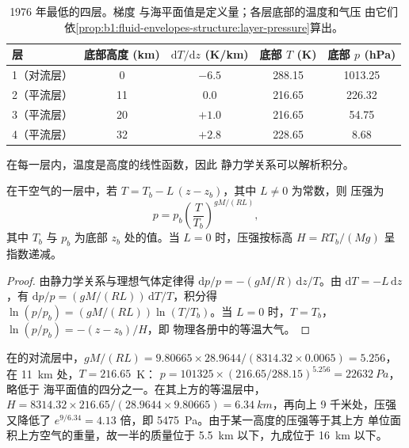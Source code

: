 \begin{table}[ht]
\centering
\small
\renewcommand{\arraystretch}{1.2}
\begin{tabular}{|l|c|c|c|c|}
\hline
层 & 底部高度 (km) & $\mathrm dT/\mathrm dz$ (K/km) & 底部 $T$ (K) & 底部 $p$ (hPa) \\
\hline
1（对流层） & 0 & $-6.5$ & 288.15 & 1013.25 \\
2（平流层） & 11 & 0.0 & 216.65 & 226.32 \\
3（平流层） & 20 & $+1.0$ & 216.65 & 54.75 \\
4（平流层） & 32 & $+2.8$ & 228.65 & 8.68 \\
\hline
\end{tabular}
\caption{1976 年最低的四层。梯度
与海平面值是定义量；各层底部的温度和气压
由它们依\cref{prop:b1:fluid-envelopes-structure:layer-pressure}算出。}
\label{tab:b1:fluid-envelopes-structure:layers}
\end{table}

在每一层内，温度是高度的线性函数，因此
静力学关系可以解析积分。

\begin{proposition}[恒定梯度层中的压强]\label{prop:b1:fluid-envelopes-structure:layer-pressure}
在干空气的一层中，若 $T = T_b - L\,(z - z_b)$，其中 $L \neq 0$ 为常数，则
压强为
\[
  p = p_b \left(\frac{T}{T_b}\right)^{gM/(RL)},
\]
其中 $T_b$ 与 $p_b$ 为底部 $z_b$ 处的值。当 $L = 0$
时，压强按标高 $H = RT_b/(Mg)$ 呈指数递减。
\end{proposition}

\begin{proof}
由静力学关系与理想气体定律得 $\mathrm dp/p = -(gM/R)\,\mathrm
dz/T$。由 $\mathrm dT = -L\,\mathrm dz$，有 $\mathrm dp/p =
(gM/(RL))\,\mathrm dT/T$，积分得 $\ln(p/p_b) = (gM/(RL))
\ln(T/T_b)$。当 $L = 0$ 时，$T = T_b$，$\ln(p/p_b) = -(z - z_b)/H$，即
物理各册中的等温大气。
\end{proof}

在的对流层中，$gM/(RL) = 9.80665 \times 28.9644 /
(8314.32 \times 0.0065) = 5.256$，在 \qty{11}{km} 处，$T = 216.65$~K：
$p = \num{101325} \times (216.65/288.15)^{5.256} = \qty{22632}{Pa}$，略低于
海平面值的四分之一。在其上方的等温层中，$H =
8314.32 \times 216.65/(28.9644 \times 9.80665) = \qty{6.34}{km}$，再向上 9
千米处，压强又降低了 $e^{9/6.34} =
4.13$ 倍，即 \qty{5475}{Pa}。由于某一高度的压强等于其上方
单位面积上方空气的重量，故一半的质量位于
\qty{5.5}{km} 以下，九成位于 \qty{16}{km} 以下。

